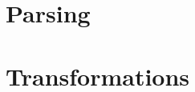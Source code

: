 \documentclass[a4paper,draft]{article}
\begin{document}
\section{Parsing}

\section{Transformations}




\nowebchunks
\end{document}
